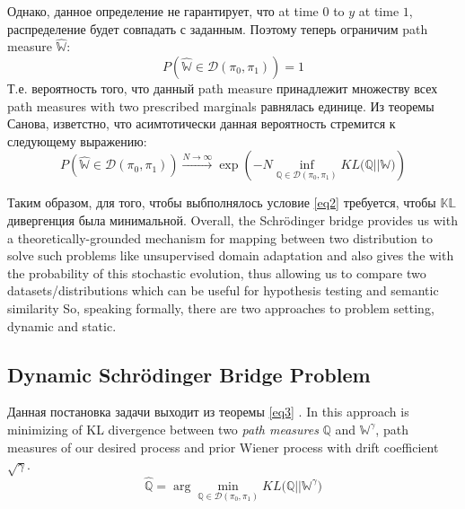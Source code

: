 \documentclass{article}
\begin{document}
Однако, данное определение не гарантирует, что at time $0$ to $y$ at time $1$, распределение будет совпадать с заданным. Поэтому теперь ограничим path measure $\hat{\mathbb{W}}$:
\begin{equation} \label{eq2}
    P\left(\hat{\mathbb{W}} \in \mathcal{D}(\pi_0, \pi_1)\right)=1
\end{equation}
Т.е. вероятность того, что данный path measure принадлежит множеству всех path measures with two prescribed marginals равнялась единице. Из теоремы Санова, изветстно, что асимтотически данная вероятность стремится к следующему выражению:
\begin{equation} \label{eq3}
    P\left(\hat{\mathbb{W}} \in \mathcal{D}(\pi_0, \pi_1)\right) \xrightarrow{N\rightarrow \infty} \exp\left(-N\inf_{\mathbb{Q} \in \mathcal{D}(\pi_0, \pi_1)}KL\mathbb{(Q||W})\right)
\end{equation}

Таким образом, для того, чтобы выбполнялось условие \ref{eq2} требуется, чтобы $\mathbb{KL}$ дивергенция была минимальной.
Overall, the Schrödinger bridge provides us with a theoretically-grounded mechanism for mapping between two distribution to solve such problems like unsupervised domain adaptation and also gives the with the probability of this stochastic evolution, thus allowing us to compare two datasets/distributions which can be useful for hypothesis testing and semantic similarity
So, speaking formally, there are two approaches to problem setting, dynamic and static.
\subsection{Dynamic Schrödinger Bridge Problem}
Данная постановка задачи выходит из теоремы \ref{eq3} . In this approach is minimizing of KL divergence between two \textit{path measures} $\mathbb{Q}$ and $\mathbb{W}^\gamma$, path measures of our desired process and prior Wiener process with drift coefficient $\sqrt\gamma$.
\begin{equation}\label{dyn}
    \hat{\mathbb{Q}} = \arg\min_{\mathbb{Q}\in \mathcal{D}(\pi_0, \pi_1)} KL\mathbb{(Q||W}^\gamma)
\end{equation}
\end{document}
